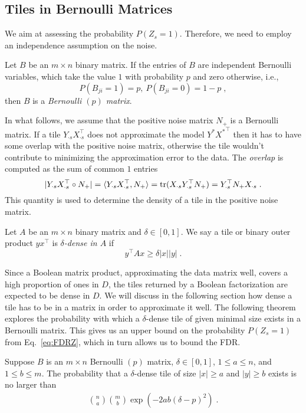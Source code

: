 \subsection{Tiles in Bernoulli Matrices}
We aim at assessing the probability $P(Z_s=1)$. Therefore, we need to employ an independence assumption on the noise. 
\begin{definition}
Let $B$ be an $m\times n$ binary matrix. If the entries of $B$ are independent Bernoulli variables, which take the value $1$ with probability $p$ and zero otherwise, i.e., 
\[P(B_{ji}=1)=p,\ P(B_{ji}=0)=1-p\;,\]
then $B$ is a \emph{Bernoulli $(p)$ matrix}.
\end{definition}
In what follows, we assume that the positive noise matrix $N_+$ is a Bernoulli matrix. If a tile $Y_{\cdot s}X_{\cdot s}^\top$ does not approximate the model $Y^*{X^*}^\top$ then it has to have some overlap with the positive noise matrix, otherwise the tile wouldn't contribute to minimizing the approximation error to the data. The \emph{overlap} is computed as the sum of common $1$ entries
\[|Y_{\cdot s}X_{\cdot s}^\top\circ N_+|=\langle Y_{\cdot s}X_{\cdot s}^\top,N_+\rangle=\operatorname*{tr}(X_{\cdot s}Y_{\cdot s}^\top N_+)=Y_{\cdot s}^\top N_+X_{\cdot s}\;.\]
This quantity is used to determine the density of a tile in the positive noise matrix.
\begin{definition}
Let $A$ be an $m\times n$ binary matrix and $\delta\in[0,1]$. We say a tile or binary outer product $yx^\top$ is \emph{$\delta$-dense in $A$}  if
\[y^\top A x \geq \delta |x||y|\;.\]
\end{definition}
Since a Boolean matrix product, approximating the data matrix well, covers a high proportion of ones in $D$, the tiles returned by a Boolean factorization are expected to be dense in $D$. We will discuss in the following section how dense a tile has to be in a matrix in order to approximate it well. The following theorem explores the probability with which a $\delta$-dense tile of given minimal size exists in a Bernoulli matrix. This gives us an upper bound on the probability $P(Z_s=1)$ from Eq.~\eqref{eq:FDRZ}, which in turn allows us to bound the FDR.
\begin{theorem}\label{thm:densProb}
Suppose $B$ is an $m\times n$ Bernoulli $(p)$ matrix, $\delta\in[0,1]$, $1\leq a\leq n$, and $1\leq b\leq m$. 
The probability that a $\delta$-dense tile of size $|x|\geq a$ and $|y|\geq b$ exists is no larger than
\begin{align}\label{eq:densBound}
\binom{n}{a}\binom{m}{b}\exp(-2ab(\delta-p)^2)\;.
\end{align}
\end{theorem}
